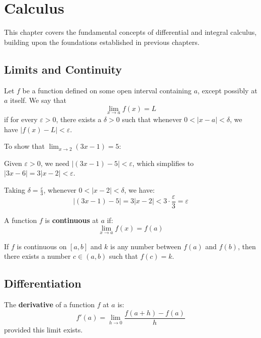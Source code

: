 \chapter{Calculus}

This chapter covers the fundamental concepts of differential and integral calculus, building upon the foundations established in previous chapters.

\section{Limits and Continuity}

\begin{definition}[Limit]
Let $f$ be a function defined on some open interval containing $a$, except possibly at $a$ itself. We say that
\[\lim_{x \to a} f(x) = L\]
if for every $\varepsilon > 0$, there exists a $\delta > 0$ such that whenever $0 < |x - a| < \delta$, we have $|f(x) - L| < \varepsilon$.
\end{definition}

\begin{example}
To show that $\lim_{x \to 2} (3x - 1) = 5$:

Given $\varepsilon > 0$, we need $|(3x - 1) - 5| < \varepsilon$, which simplifies to $|3x - 6| = 3|x - 2| < \varepsilon$.

Taking $\delta = \frac{\varepsilon}{3}$, whenever $0 < |x - 2| < \delta$, we have:
\[|(3x - 1) - 5| = 3|x - 2| < 3 \cdot \frac{\varepsilon}{3} = \varepsilon\]
\end{example}

\begin{definition}[Continuity]
A function $f$ is \textbf{continuous} at $a$ if:
\[\lim_{x \to a} f(x) = f(a)\]
\end{definition}

\begin{theorem}
If $f$ is continuous on $[a, b]$ and $k$ is any number between $f(a)$ and $f(b)$, then there exists a number $c \in (a, b)$ such that $f(c) = k$.
\end{theorem}

\section{Differentiation}

\begin{definition}[Derivative]
The \textbf{derivative} of a function $f$ at $a$ is:
\[f'(a) = \lim_{h \to 0} \frac{f(a + h) - f(a)}{h}\]
provided this limit exists.
\end{definition}

